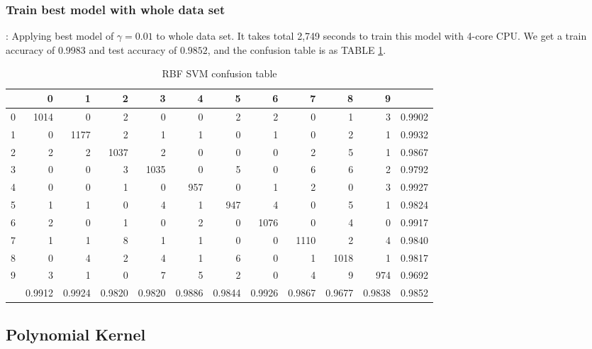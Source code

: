 \documentclass[8pt]{beamer}
\begin{document}
\subsubsection{Train best model with whole data set}
\begin{frame}[allowframebreaks]{\secname : \subsecname}{\subsubsecname}
Applying best model of $\gamma=0.01$ to whole data set. It takes total 2,749 seconds to train this model with 4-core CPU. We get a train accuracy of 0.9983 and test accuracy of $0.9852$, and the confusion table is as TABLE \ref{tab:RBF SVM confusion table}.
\begin{table}[htbp]
\tiny
  \centering
  \caption{RBF SVM confusion table}
\begin{tabular}{|r|rrrrrrrrrr|r|}
\hline
  & 0 & 1 & 2 & 3 & 4 & 5 & 6 & 7 & 8 & 9 &  \\
\hline
0 & 1014 & 0 & 2 & 0 & 0 & 2 & 2 & 0 & 1 & 3 & 0.9902 \\
1 & 0 & 1177 & 2 & 1 & 1 & 0 & 1 & 0 & 2 & 1 & 0.9932 \\
2 & 2 & 2 & 1037 & 2 & 0 & 0 & 0 & 2 & 5 & 1 & 0.9867 \\
3 & 0 & 0 & 3 & 1035 & 0 & 5 & 0 & 6 & 6 & 2 & 0.9792 \\
4 & 0 & 0 & 1 & 0 & 957 & 0 & 1 & 2 & 0 & 3 & 0.9927 \\
5 & 1 & 1 & 0 & 4 & 1 & 947 & 4 & 0 & 5 & 1 & 0.9824 \\
6 & 2 & 0 & 1 & 0 & 2 & 0 & 1076 & 0 & 4 & 0 & 0.9917 \\
7 & 1 & 1 & 8 & 1 & 1 & 0 & 0 & 1110 & 2 & 4 & 0.9840 \\
8 & 0 & 4 & 2 & 4 & 1 & 6 & 0 & 1 & 1018 & 1 & 0.9817 \\
9 & 3 & 1 & 0 & 7 & 5 & 2 & 0 & 4 & 9 & 974 & 0.9692 \\
\hline
  & 0.9912 & 0.9924 & 0.9820 & 0.9820 & 0.9886 & 0.9844 & 0.9926 & 0.9867 & 0.9677 & 0.9838 & 0.9852 \\
\hline
\end{tabular}%
  \label{tab:RBF SVM confusion table}%
\end{table}%
\end{frame}









\subsection{Polynomial Kernel}
\end{document}
